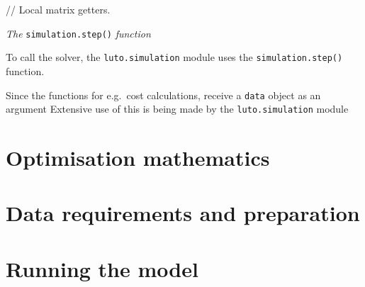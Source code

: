 \documentclass{draft}
\begin{document}
// Local matrix getters.

\emph{The} \texttt{simulation.step()} \emph{function}

To call the solver, the \texttt{luto.simulation} module uses the \texttt{simulation.step()} function.




Since the functions for e.g.\ cost calculations, receive a \texttt{data} object as an argument %
Extensive use of this is being made by the \texttt{luto.simulation} module

\section{Optimisation mathematics}\label{sec:mathematics}

\section{Data requirements and preparation}\label{sec:dataprep}

\section{Running the model}\label{sec:running}
\end{document}
